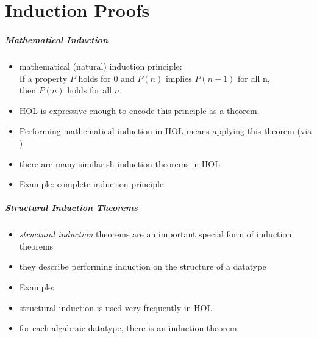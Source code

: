 \part{Induction Proofs}

\frame[plain]{\partpage}

\begin{frame}
\frametitle{Mathematical Induction}
\begin{itemize}
\item mathematical (\aka natural) induction principle:\\
  If a property $P$ holds for 0 and $P(n)$ implies $P(n+1)$ for all n,\\
  then $P(n)$ holds for all $n$.
\item HOL is expressive enough to encode this principle as a theorem.\\\medskip
{}\medskip
\item Performing mathematical induction in HOL means applying this theorem (\eg via )

\item there are many similarish induction theorems in HOL
\item Example: complete induction principle\\\medskip
{}
\end{itemize}
\end{frame}


\begin{frame}
\frametitle{Structural Induction Theorems}
\begin{itemize}
\item \emph{structural induction} theorems are an important special form of induction theorems 
\item they describe performing induction on the structure of a datatype
\item Example: 
\item structural induction is used very frequently in HOL
\item for each algabraic datatype, there is an induction theorem
\end{itemize}
\end{frame}



